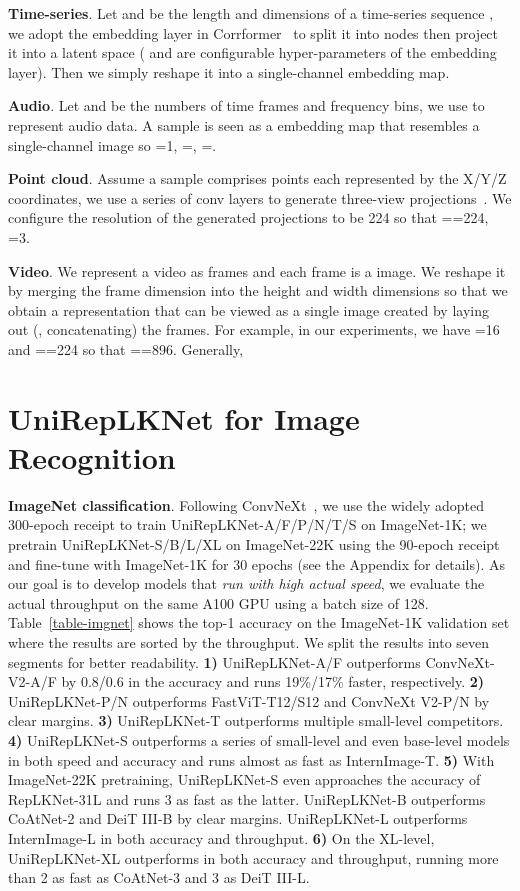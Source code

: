 \documentclass[10pt,twocolumn,letterpaper]{article}
\begin{document}
    \noindent\textbf{Time-series}. Let  and  be the length and dimensions of a time-series sequence , we adopt the embedding layer in Corrformer~\cite{wu2023interpretable} to split it into  nodes then project it into a latent space  ( and  are configurable hyper-parameters of the embedding layer). Then we simply reshape it into a single-channel embedding map.
    
\textbf{Audio}. Let  and  be the numbers of time frames and frequency bins, we use  to represent audio data. A sample is seen as a  embedding map that resembles a single-channel image so =1, =, =.
	
\textbf{Point cloud}. Assume a sample comprises  points each represented by the X/Y/Z coordinates, we use a series of conv layers to generate three-view projections~\cite{zhang2023meta}. We configure the resolution of the generated projections to be 224 so that ==224, =3.
 	
\textbf{Video}. We represent a video as  frames and each frame is a  image. We reshape it by merging the frame dimension into the height and width dimensions so that we obtain a representation that can be viewed as a single image created by laying out (\ie, concatenating) the  frames. For example, in our experiments, we have =16 and ==224 so that ==896. Generally,
    

    \vspace{-0.2in}

 \section{UniRepLKNet for Image Recognition}

\textbf{ImageNet classification}. Following ConvNeXt~\cite{liu2022convnet}, we use the widely adopted 300-epoch receipt to train UniRepLKNet-A/F/P/N/T/S on ImageNet-1K; we pretrain UniRepLKNet-S/B/L/XL on ImageNet-22K using the 90-epoch receipt and fine-tune with ImageNet-1K for 30 epochs (see the Appendix for details). As our goal is to develop models that \emph{run with high actual speed}, we evaluate the actual throughput on the same A100 GPU using a batch size of 128. Table~\ref{table-imgnet} shows the top-1 accuracy on the ImageNet-1K validation set where the results are sorted by the throughput. We split the results into seven segments for better readability. \textbf{1)} UniRepLKNet-A/F outperforms ConvNeXt-V2-A/F by 0.8/0.6 in the accuracy and runs 19\%/17\% faster, respectively. \textbf{2)} UniRepLKNet-P/N outperforms FastViT-T12/S12 and ConvNeXt V2-P/N by clear margins. \textbf{3)} UniRepLKNet-T outperforms multiple small-level competitors. \textbf{4)} UniRepLKNet-S outperforms a series of small-level and even base-level models in both speed and accuracy and runs almost as fast as InternImage-T. \textbf{5)} With ImageNet-22K pretraining, UniRepLKNet-S even approaches the accuracy of RepLKNet-31L and runs 3 as fast as the latter. UniRepLKNet-B outperforms CoAtNet-2 and DeiT III-B by clear margins. UniRepLKNet-L outperforms InternImage-L in both accuracy and throughput. \textbf{6)} On the XL-level, UniRepLKNet-XL outperforms in both accuracy and throughput, running more than 2 as fast as CoAtNet-3 and 3 as DeiT III-L.
\end{document}
